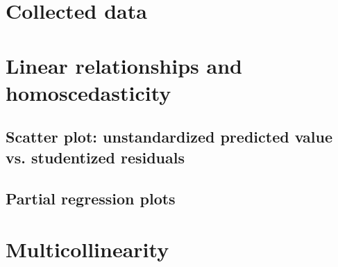 \documentclass{sigchi}
\begin{document}






\clearpage
\onecolumn

\appendix
\section{Collected data} %
\label{sec:collected_data}


\section{Linear relationships and homoscedasticity}
\label{app:linear_relationships}

\subsection{Scatter plot: unstandardized predicted value vs. studentized residuals}
\hfill \break

\clearpage

\subsection{Partial regression plots}
\hfill \break


\clearpage

\section{Multicollinearity} %
\label{app:multicollinearity}
\hfill \break

\clearpage
\end{document}

